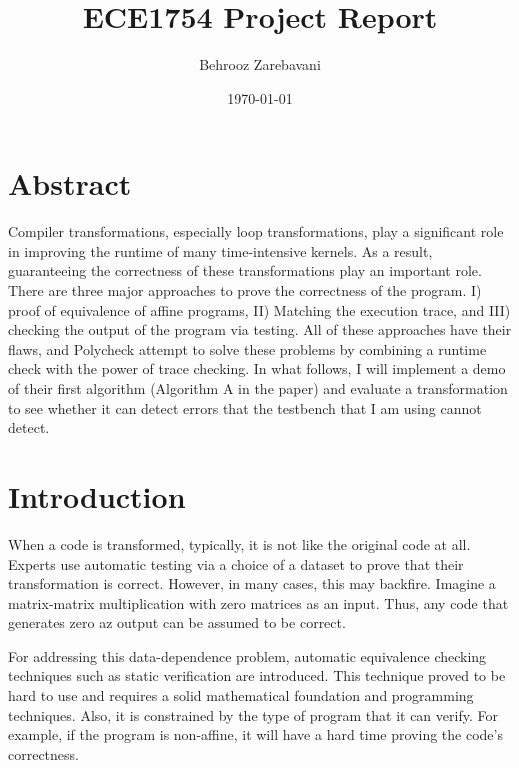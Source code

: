 \documentclass[letterpaper,12pt]{article}
\begin{document}
	
	\title{ECE1754 Project Report}
	\author{Behrooz Zarebavani}
	\date{\today}
	\maketitle
	\section{Abstract}
	
	
	Compiler transformations, especially loop transformations, play a significant role in improving the runtime of many time-intensive kernels. As a result, guaranteeing the correctness of these transformations play an important role. There are three major approaches to prove the correctness of the program. I) proof of equivalence of affine programs, II) Matching the execution trace, and III) checking the output of the program via testing. All of these approaches have their flaws, and Polycheck attempt to solve these problems by combining a runtime check with the power of trace checking. In what follows, I will implement a demo of their first algorithm (Algorithm A in the paper) and evaluate a transformation to see whether it can detect errors that the testbench that I am using cannot detect.
	
	
	\section{Introduction}
	
	When a code is transformed, typically, it is not like the original code at all. Experts use automatic testing via a choice of a dataset to prove that their transformation is correct. However, in many cases, this may backfire. Imagine a matrix-matrix multiplication with zero matrices as an input. Thus, any code that generates zero az output can be assumed to be correct.

	For addressing this data-dependence problem, automatic equivalence checking techniques such as static verification are introduced. This technique proved to be hard to use and requires a solid mathematical foundation and programming techniques. Also, it is constrained by the type of program that it can verify. For example, if the program is non-affine, it will have a hard time proving the code's correctness.
	
\end{document}
